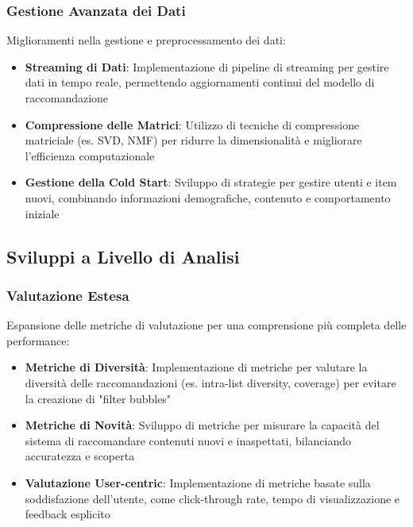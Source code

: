 \subsubsection{Gestione Avanzata dei Dati}

Miglioramenti nella gestione e preprocessamento dei dati:

\begin{itemize}
    \item \textbf{Streaming di Dati}: Implementazione di pipeline di streaming per gestire dati in tempo reale, permettendo aggiornamenti continui del modello di raccomandazione
    
    \item \textbf{Compressione delle Matrici}: Utilizzo di tecniche di compressione matriciale (es. SVD, NMF) per ridurre la dimensionalità e migliorare l'efficienza computazionale
    
    \item \textbf{Gestione della Cold Start}: Sviluppo di strategie per gestire utenti e item nuovi, combinando informazioni demografiche, contenuto e comportamento iniziale
\end{itemize}

\subsection{Sviluppi a Livello di Analisi}

\subsubsection{Valutazione Estesa}

Espansione delle metriche di valutazione per una comprensione più completa delle performance:

\begin{itemize}
    \item \textbf{Metriche di Diversità}: Implementazione di metriche per valutare la diversità delle raccomandazioni (es. intra-list diversity, coverage) per evitare la creazione di "filter bubbles"
    
    \item \textbf{Metriche di Novità}: Sviluppo di metriche per misurare la capacità del sistema di raccomandare contenuti nuovi e inaspettati, bilanciando accuratezza e scoperta
    
    \item \textbf{Valutazione User-centric}: Implementazione di metriche basate sulla soddisfazione dell'utente, come click-through rate, tempo di visualizzazione e feedback esplicito
\end{itemize}

